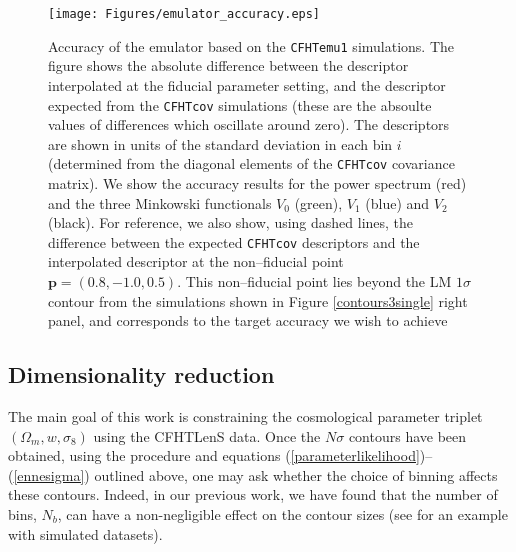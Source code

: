 \documentclass[reprint,aps,prd,superscriptaddress,showkeys,showpacs]{revtex4-1}
\begin{document}
\begin{figure*}
\begin{center}
\texttt{[image: Figures/emulator\_accuracy.eps]}
\end{center}
\caption{Accuracy of the emulator based on the \texttt{CFHTemu1}
  simulations. The figure shows the absolute difference between the descriptor
  interpolated at the fiducial parameter setting, and the descriptor
  expected from the \texttt{CFHTcov} simulations (these are the absoulte values of differences which oscillate around zero). The descriptors are
  shown in units of the standard deviation in each bin $i$ (determined
  from the diagonal elements of the \texttt{CFHTcov} covariance
  matrix). We show the accuracy results for the power spectrum (red)
  and the three Minkowski functionals $V_0$ (green), $V_1$ (blue) and
  $V_2$ (black). For reference, we also show, using dashed lines, the
  difference between the expected \texttt{CFHTcov} descriptors and the
  interpolated descriptor at the non--fiducial point $\mathbf{p}=(0.8,-1.0,0.5)$. This non--fiducial point lies beyond the LM $1\sigma$ contour from the simulations shown in Figure \ref{contours3single} right panel, and corresponds to the target accuracy we wish to achieve}
\label{emulatorAccuracy}
\end{figure*}  

\subsection{Dimensionality reduction}
\label{pcasection}

The main goal of this work is constraining the cosmological parameter
triplet $(\Omega_m,w,\sigma_8)$ using the CFHTLenS data.  Once the
$N\sigma$ contours have been obtained, using the procedure and
equations (\ref{parameterlikelihood})--(\ref{ennesigma}) outlined
above, one may ask whether the choice of binning affects these
contours.  Indeed, in our previous work, we have found that the number
of bins, $N_b$, can have a non-negligible effect on the contour sizes
(see \citep{Petri2013} for an example with simulated datasets).
\end{document}
